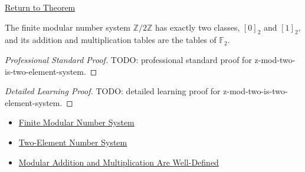 \newpage
{}
\label{prf:z-mod-two-is-two-element-system}

\begin{remark*}[Return]
\hyperref[thm:z-mod-two-is-two-element-system]{Return to Theorem}
\end{remark*}

\begin{theorem*}
The finite modular number system \(\mathbb{Z}/2\mathbb{Z}\) has exactly two
classes, \([0]_2\) and \([1]_2\), and its addition and multiplication tables
are the tables of \(\mathbb{F}_2\).
\end{theorem*}

\begin{proof}[Professional Standard Proof]
\LRAProofBodyStart
TODO: professional standard proof for z-mod-two-is-two-element-system.
\end{proof}

\begin{proof}[Detailed Learning Proof]
\LRAProofBodyStart
TODO: detailed learning proof for z-mod-two-is-two-element-system.
\end{proof}

\begin{remark*}
\end{remark*}

\begin{dependencies}
\begin{itemize}
  \item \hyperref[def:finite-modular-number-system]{Finite Modular Number System}
  \item \hyperref[def:two-element-number-system]{Two-Element Number System}
  \item \hyperref[thm:modular-operations-well-defined]{Modular Addition and Multiplication Are Well-Defined}
\end{itemize}
\end{dependencies}

\clearpage
